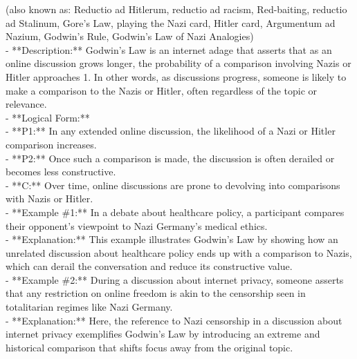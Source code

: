 \documentclass[a4paper,12pt,single,pdftex]{scrartcl}
\begin{document}
      (also known as: Reductio ad Hitlerum, reductio ad racism, Red-baiting, reductio ad Stalinum, Gore's Law, playing the Nazi card, Hitler card, Argumentum ad Nazium, Godwin's Rule, Godwin's Law of Nazi Analogies)
    \\

  
    
      - **Description:** Godwin's Law is an internet adage that asserts that as an online discussion grows longer, the probability of a comparison involving Nazis or Hitler approaches 1. In other words, as discussions progress, someone is likely to make a comparison to the Nazis or Hitler, often regardless of the topic or relevance.
    \\

    
      - **Logical Form:**
    \\

    
        - **P1:** In any extended online discussion, the likelihood of a Nazi or Hitler comparison increases.
    \\

    
        - **P2:** Once such a comparison is made, the discussion is often derailed or becomes less constructive.
    \\

    
        - **C:** Over time, online discussions are prone to devolving into comparisons with Nazis or Hitler.
    \\

    
      - **Example \#1:** In a debate about healthcare policy, a participant compares their opponent's viewpoint to Nazi Germany's medical ethics.
    \\

    
      - **Explanation:** This example illustrates Godwin's Law by showing how an unrelated discussion about healthcare policy ends up with a comparison to Nazis, which can derail the conversation and reduce its constructive value.
    \\

    
      - **Example \#2:** During a discussion about internet privacy, someone asserts that any restriction on online freedom is akin to the censorship seen in totalitarian regimes like Nazi Germany.
    \\

    
      - **Explanation:** Here, the reference to Nazi censorship in a discussion about internet privacy exemplifies Godwin's Law by introducing an extreme and historical comparison that shifts focus away from the original topic.
    \\
\end{document}
